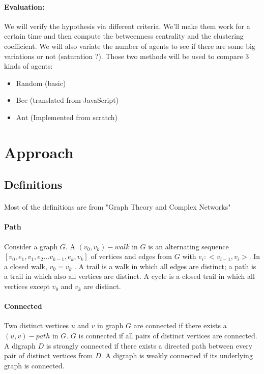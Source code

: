 \documentclass{article}
\newenvironment{itemh}[0]{\begin{itemize}[label=$\heartsuit$, font=\color{mygray} \small]}{\end{itemize}}
\begin{document}
	\paragraph{Evaluation:}
	We will verify the hypothesis via different criteria.
	We'll make them work for a certain time and then compute the betweenness centrality and the clustering coefficient.
	We will also variate the number of agents to see if there are some big variations or not (saturation ?).
	Those two methods will be used to compare 3 kinds of agents:
	\begin{itemh}
	\item Random (basic)
	\item Bee (translated from JavaScript)
	\item Ant (Implemented from scratch)
	\end{itemh}

\newpage
\section{Approach}
	\subsection{Definitions}
		\paragraph{}
			Most of the definitions are from "Graph Theory and Complex Networks"\cite{Steen10}
		\paragraph{Path}
			Consider a graph $G$.
			A $(v_0 , v_k)-walk$ in $G$ is an alternating sequence $[ v_0 , e_1 , v_1 , e_2 \dots v_{k-1} , e_k , v_k ]$ of vertices
			and edges from $G$ with $e_i : <v_{i-1},v_i>$.
			In a closed walk, $v_0 = v_k$ .
			A trail is a walk in which all edges are distinct; a path is a trail in which also all vertices are distinct.
			A cycle is a closed trail in which all vertices except $v_0$ and $v_k$ are distinct.
		\paragraph{Connected}
			Two distinct vertices $u$ and $v$ in graph $G$ are connected if there exists a $(u, v) - path$ in $G$.
			$G$ is connected if all pairs of distinct vertices are connected.
			A digraph $D$ is strongly connected if there exists a directed path between every pair of distinct vertices from $D$.
			A digraph is weakly connected if its underlying graph is connected.
\end{document}
